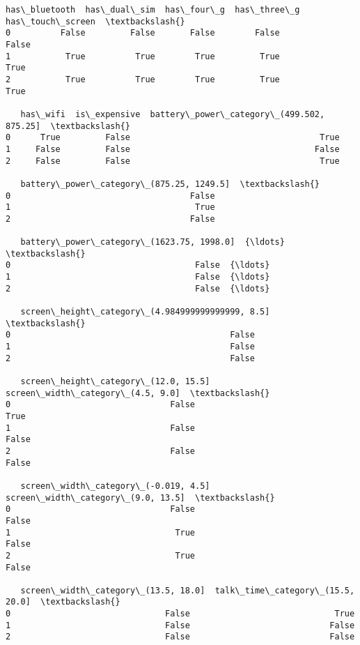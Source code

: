 \documentclass[11pt]{article}
\makeatletter
\newcommand{\boxspacing}{\kern\kvtcb@left@rule\kern\kvtcb@boxsep}
\newcommand{\prompt}[4]{
        {\ttfamily\llap{{\color{#2}[#3]:\hspace{3pt}#4}}\vspace{-\baselineskip}}
    }
\makeatother
\begin{document}
            \begin{tcolorbox}[breakable, size=fbox, boxrule=.5pt, pad at break*=1mm, opacityfill=0]
\prompt{Out}{outcolor}{33}{\boxspacing}
\begin{Verbatim}[commandchars=\\\{\}]
   has\_bluetooth  has\_dual\_sim  has\_four\_g  has\_three\_g  has\_touch\_screen  \textbackslash{}
0          False         False       False        False             False
1           True          True        True         True              True
2           True          True        True         True              True

   has\_wifi  is\_expensive  battery\_power\_category\_(499.502, 875.25]  \textbackslash{}
0      True         False                                      True
1     False         False                                     False
2     False         False                                      True

   battery\_power\_category\_(875.25, 1249.5]  \textbackslash{}
0                                    False
1                                     True
2                                    False

   battery\_power\_category\_(1623.75, 1998.0]  {\ldots}  \textbackslash{}
0                                     False  {\ldots}
1                                     False  {\ldots}
2                                     False  {\ldots}

   screen\_height\_category\_(4.984999999999999, 8.5]  \textbackslash{}
0                                            False
1                                            False
2                                            False

   screen\_height\_category\_(12.0, 15.5]  screen\_width\_category\_(4.5, 9.0]  \textbackslash{}
0                                False                              True
1                                False                             False
2                                False                             False

   screen\_width\_category\_(-0.019, 4.5]  screen\_width\_category\_(9.0, 13.5]  \textbackslash{}
0                                False                              False
1                                 True                              False
2                                 True                              False

   screen\_width\_category\_(13.5, 18.0]  talk\_time\_category\_(15.5, 20.0]  \textbackslash{}
0                               False                             True
1                               False                            False
2                               False                            False


\end{Verbatim}
\end{tcolorbox}
\end{document}
